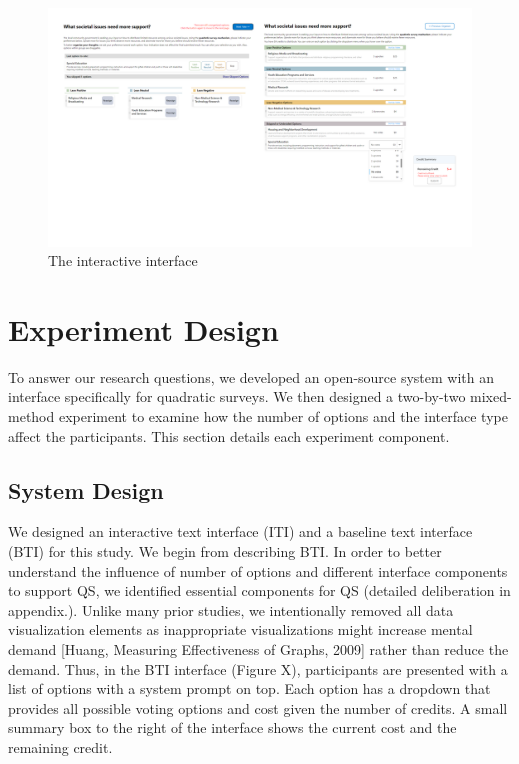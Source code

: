 \begin{figure}[h]
    \centering
    \includegraphics[width=1\textwidth]{content/image/interface.png}
    \caption{The interactive interface}
    \label{fig:interactiveInterface}
\end{figure}

\section{Experiment Design}
To answer our research questions, we developed an open-source system with an interface specifically for quadratic surveys. We then designed a two-by-two mixed-method experiment to examine how the number of options and the interface type affect the participants. This section details each experiment component.

\subsection{System Design}
We designed an interactive text interface (ITI) and a baseline text interface (BTI) for this study. We begin from describing BTI. In order to better understand the influence of number of options and different interface components to support QS, we identified essential components for QS (detailed deliberation in appendix.). Unlike many prior studies, we intentionally removed all data visualization elements as inappropriate visualizations might increase mental demand [Huang, Measuring Effectiveness of Graphs, 2009] rather than reduce the demand. Thus, in the BTI interface (Figure X), participants are presented with a list of options with a system prompt on top. Each option has a dropdown that provides all possible voting options and cost given the number of credits. A small summary box to the right of the interface shows the current cost and the remaining credit.

